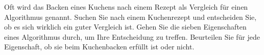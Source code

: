 %
%
Oft wird das Backen eines Kuchens nach einem Rezept als Vergleich für einen Algorithmus genannt. Suchen Sie nach einem Kuchenrezept und entscheiden Sie, ob es sich wirklich ein guter Vergleich ist. Gehen Sie die sieben Eigenschaften eines Algorithmus durch, um Ihre Entscheidung zu treffen. Beurteilen Sie für jede Eigenschaft, ob sie beim Kuchenbacken erfüllt ist oder nicht.

